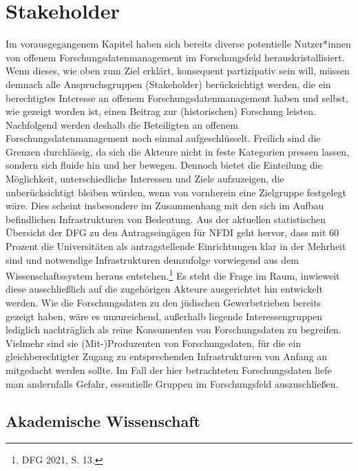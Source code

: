 \section{Stakeholder}
 
Im vorausgegangenem Kapitel haben sich bereits diverse potentielle Nutzer*innen von offenem Forschungsdatenmanagement im Forschungsfeld herauskristallisiert. Wenn dieses, wie oben zum Ziel erklärt, konsequent partizipativ sein will, müssen demnach alle Anspruchsgruppen (Stakeholder) berücksichtigt werden, die ein berechtigtes Interesse an offenem Forschungsdatenmanagement haben und selbst, wie gezeigt worden ist, einen Beitrag zur (historischen) Forschung leisten. Nachfolgend werden deshalb die Beteiligten an offenem Forschungsdatenmanagement noch einmal aufgeschlüsselt. Freilich sind die Grenzen durchlässig, da sich die Akteure nicht in feste Kategorien pressen lassen, sondern sich fluide hin und her bewegen. Dennoch bietet die Einteilung die Möglichkeit, unterschiedliche Interessen und Ziele aufzuzeigen, die unberücksichtigt bleiben würden, wenn von vornherein eine Zielgruppe festgelegt wäre. Dies scheint insbesondere im Zusammenhang mit den sich im Aufbau befindlichen Infrastrukturen von Bedeutung. Aus der aktuellen statistischen Übersicht der DFG zu den Antragseingägen für NFDI geht hervor, dass mit 60 Prozent die Universitäten als antragstellende Einrichtungen klar in der Mehrheit sind und notwendige Infrastrukturen demzufolge vorwiegend aus dem Wissenschaftssystem heraus entstehen.\footnote{DFG 2021, S. 13.} Es steht die Frage im Raum, inwieweit diese ausschließlich auf die zugehörigen Akteure ausgerichtet hin entwickelt werden. Wie die Forschungsdaten zu den jüdischen Gewerbetrieben bereits gezeigt haben, wäre es unzureichend, außerhalb liegende Interessengruppen lediglich nachträglich als reine Konsumenten von Forschungsdaten zu begreifen. Vielmehr sind sie (Mit-)Produzenten von Forschungsdaten, für die ein gleichberechtigter Zugang zu entsprechenden Infrastrukturen von Anfang an mitgedacht werden sollte. Im Fall der hier betrachteten Forschungsdaten liefe man andernfalls Gefahr, essentielle Gruppen im Forschungsfeld auszuschließen.

\subsection{Akademische Wissenschaft}

